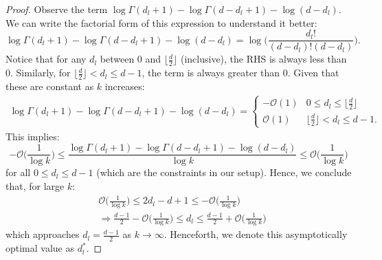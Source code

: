 \begin{proof}
Observe the term $\log\Gamma(d_l+1) - \log\Gamma(d-d_l+1) - \log(d-d_l)$. 
We can write the factorial form of this expression to understand it better:
\begin{equation}
    \log\Gamma(d_l+1) - \log\Gamma(d-d_l+1) - \log(d-d_l) = \log\Big(\frac{d_l!}{(d-d_l)!(d-d_l)}\Big).
\end{equation}
Notice that for any $d_l$ between $0$ and $\lfloor\frac{d}{2}\rfloor$ (inclusive), the RHS is always less than $0$. Similarly, for $\lfloor\frac{d}{2}\rfloor < d_l \leq d - 1 $, the term is always greater than $0$. Given that these are constant as $k$ increases: 
\begin{align}
    \log\Gamma(d_l+1) - \log\Gamma(d-d_l+1) - \log(d-d_l) =
    \begin{cases}
        -\mathcal{O}(1) & \textrm{$0 \leq d_l \leq \lfloor\frac{d}{2}\rfloor$}\\
        \mathcal{O}(1) & \textrm{$\lfloor\frac{d}{2}\rfloor < d_l \leq d - 1$}.
    \end{cases}
\end{align}
This implies: 
\begin{equation}
     -\mathcal{O}\Big(\frac{1}{\log k}\Big) \leq \frac{\log\Gamma(d_l+1) - \log\Gamma(d-d_l+1) - \log(d-d_l)}{\log k} \leq \mathcal{O}\Big(\frac{1}{\log k}\Big)
\end{equation}
for all $0 \leq d_l \leq d-1$ (which are the constraints in our setup). Hence, we conclude that, for large $k$:
\begin{align}
    &\mathcal{O}\Big(\frac{1}{\log k}\Big) \leq 2d_l - d + 1 \leq -\mathcal{O}\Big(\frac{1}{\log k}\Big)\\
    &\Rightarrow \frac{d-1}{2} - \mathcal{O}\Big(\frac{1}{\log k}\Big) \leq d_l \leq \frac{d-1}{2} + \mathcal{O}\Big(\frac{1}{\log k}\Big)
\end{align}
which approaches $d_l = \frac{d-1}{2}$ as $k \rightarrow \infty$. Henceforth, we denote this asymptotically optimal value as $d_l^*$.

\end{proof}
